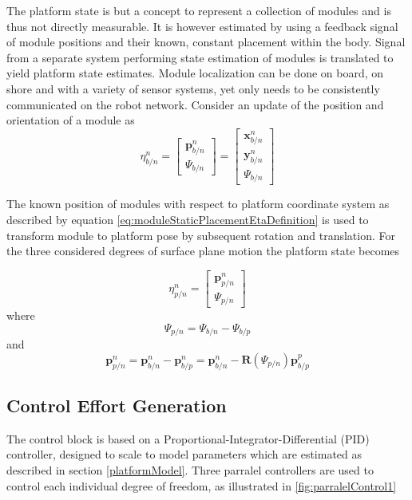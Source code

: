 The platform state is but a concept to represent a collection of modules and is thus not directly measurable. It is however estimated by using a feedback signal of module positions and their known, constant placement within the body. Signal from a separate system performing state estimation of modules is translated to yield platform state estimates. Module localization can be done on board, on shore and with a variety of sensor systems, yet only needs to be consistently communicated on the robot network. Consider an update of the position and orientation of a module as
\begin{equation}
\eta_{b/n}^{n} = \begin{bmatrix} \textbf{p}_{b/n}^{n} \\[10pt] \Psi_{b/n}\end{bmatrix} = \begin{bmatrix} \textbf{x}_{b/n}^{n} \\[10pt] \textbf{y}_{b/n}^{n} \\[10pt] \Psi_{b/n}\end{bmatrix} 
\end{equation}

The known position of modules with respect to platform coordinate system as described by equation \ref{eq:moduleStaticPlacementEtaDefinition} is used to transform module to platform pose by subsequent rotation and translation. For the three considered degrees of surface plane motion the platform state becomes

\begin{equation}
\eta_{p/n}^{n} = \begin{bmatrix} \textbf{p}_{p/n}^{n} \\[10pt] \Psi_{p/n}\end{bmatrix}
\end{equation}
where
\begin{equation}
 \Psi_{p/n} = \Psi_{b/n} - \Psi_{b/p}
\end{equation}
and
\begin{equation}
\textbf{p}_{p/n}^{n} =  \textbf{p}_{b/n}^{n} - \textbf{p}_{b/p}^{n} =  \textbf{p}_{b/n}^{n} - \textbf{R}(\Psi_{p/n}) \textbf{p}_{b/p}^{p} 
\end{equation}


\subsection{Control Effort Generation}
\label{controlEffortGenerationDesign}
The control block is based on a Proportional-Integrator-Differential (PID) controller, designed to scale to model parameters which are estimated as described in section \ref{platformModel}. Three parralel controllers are used to control each individual degree of freedom, as illustrated in \ref{fig:parralelControl1}

